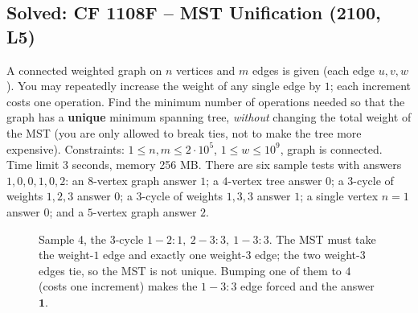 \subsection{Solved: CF 1108F -- MST Unification (2100, L5)}


\begin{problemstatement}
A connected weighted graph on \(n\) vertices and \(m\) edges is given (each edge
\(u,v,w\)).  You may repeatedly increase the weight of any single edge by \(1\);
each increment costs one operation.  Find the minimum number of operations needed
so that the graph has a \textbf{unique} minimum spanning tree, \emph{without}
changing the total weight of the MST (you are only allowed to break ties, not to
make the tree more expensive).  Constraints: \(1\le n,m\le 2\cdot 10^5\),
\(1\le w\le 10^9\), graph is connected.  Time limit 3 seconds, memory 256 MB.
There are six sample tests with answers \(1,0,0,1,0,2\): an \(8\)-vertex graph
answer \(1\); a \(4\)-vertex tree answer \(0\); a \(3\)-cycle of weights
\(1,2,3\) answer \(0\); a \(3\)-cycle of weights \(1,3,3\) answer \(1\); a
single vertex \(n=1\) answer \(0\); and a \(5\)-vertex graph answer \(2\).
\end{problemstatement}

\begin{figure}[H]
\centering
{}
\caption{Sample 4, the \(3\)-cycle \(1\!-\!2{:}1,\ 2\!-\!3{:}3,\ 1\!-\!3{:}3\).  The
MST must take the weight-\(1\) edge and exactly one weight-\(3\) edge; the two
weight-\(3\) edges tie, so the MST is not unique.  Bumping one of them to \(4\)
(costs one increment) makes the \(1\!-\!3{:}3\) edge forced and the answer
\(\mathbf{1}\).}
\label{fig:c17-unify}
\end{figure}

